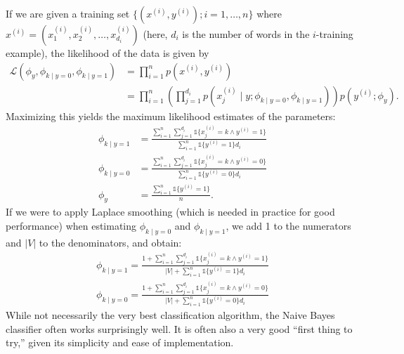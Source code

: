 If we are given a training set $\{(x^{(i)} ,y^{(i)} );i = 1,\ldots,n\}$ where $x^{(i)} = (x^{(i)}_1,x^{(i)}_2,\ldots,x^{(i)}_{d_i})$ (here, $d_i$ is the number of words in the $i$-training example), the likelihood of the data is given by
\begin{align}
    \mathcal L(\phi_y ,\phi_{k \mid y=0} ,\phi_{k \mid y=1} ) &= \prod_{i=1}^{n} p(x^{(i)} ,y^{(i)} )\\
    &= \prod_{i=1}^{n}\left( \prod_{j=1}^{d_i} p(x^{(i)}_j \mid y;\phi_{k \mid y=0} ,\phi_{k \mid y=1}) \right) p(y^{(i)} ;\phi_y).
\end{align}
Maximizing this yields the maximum likelihood estimates of the parameters:
\begin{align}
    \phi_{k \mid y=1} &= \frac{\sum^{n}_{i=1}\sum^{d_i}_{j=1} \mathbb{1}\{x^{(i)}_j = k \wedge y^{(i)} = 1\}}{\sum^{n}_{i=1} \mathbb{1}\{y^{(i)} = 1\}d_i}\\
    \phi_{k \mid y=0} &= \frac{\sum^{n}_{i=1}\sum^{d_i}_{j=1} \mathbb{1}\{x^{(i)}_j = k \wedge y^{(i)} = 0\}}{\sum^{n}_{i=1} \mathbb{1}\{y^{(i)} = 0\}d_i}\\
    \phi_y &= \frac{\sum^{n}_{i=1} \mathbb{1}\{y^{(i)}= 1\}}{n}.
\end{align}
If we were to apply Laplace smoothing (which is needed in practice for good
performance) when estimating $\phi_{k \mid y=0}$ and $\phi_{k \mid y=1}$, we add 1 to the numerators
and $|V|$ to the denominators, and obtain:
\begin{align}
    \phi_{k \mid y=1} = \frac{1 + \sum^{n}_{i=1}\sum^{d_i}_{j=1} \mathbb{1}\{x^{(i)}_j = k \wedge y^{(i)} = 1\}}{|V| + \sum^{n}_{i=1} \mathbb{1}\{y^{(i)} = 1\}d_i}\\
    \phi_{k \mid y=0} = \frac{1 + \sum^{n}_{i=1}\sum^{d_i}_{j=1} \mathbb{1}\{x^{(i)}_j = k \wedge y^{(i)} = 0\}}{|V| + \sum^{n}_{i=1} \mathbb{1}\{y^{(i)} = 0\}d_i}
\end{align}
While not necessarily the very best classification algorithm, the Naive Bayes
classifier often works surprisingly well. It is often also a very good ``first thing
to try,'' given its simplicity and ease of implementation.